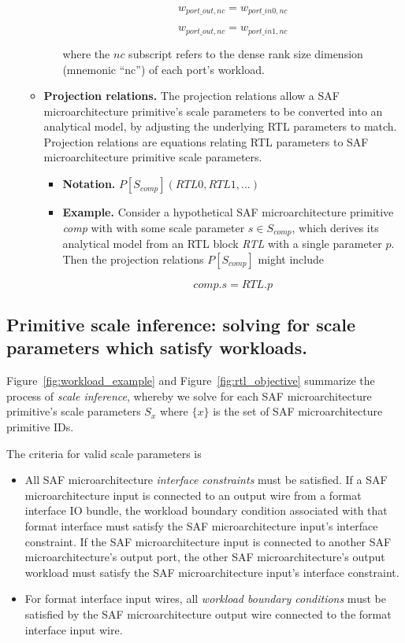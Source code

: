 \begin{itemize}
\begin{itemize}
\begin{itemize}
            \[w_{port\_out,nc} = w_{port\_in0,nc}\]

            \[w_{port\_out,nc} = w_{port\_in1,nc}\]

            where the $nc$ subscript refers to the dense rank size dimension (mnemonic ``nc'') of each port's workload.
        \end{itemize}
        \item \textbf{Projection relations.} The projection relations allow a SAF microarchitecture primitive's scale parameters to be converted into an analytical model, by adjusting the underlying RTL parameters to match. Projection relations are equations relating RTL parameters to SAF microarchitecture primitive scale parameters.
        \begin{itemize}
            \item \textbf{Notation.} $P[S_{comp}](RTL0,RTL1,...)$
            \item \textbf{Example.} Consider a hypothetical SAF microarchitecture primitive \textit{comp} with with some scale parameter $s \in S_{comp}$, which derives its analytical model from an RTL block \textit{RTL} with a single parameter $p$. Then the projection relations $P[S_{comp}]$ might include

            \[comp.s = RTL.p\]
        \end{itemize}
    \end{itemize}
\end{itemize}

\subsection{Primitive scale inference: solving for scale parameters which satisfy workloads.}

Figure~\ref{fig:workload_example} and Figure~\ref{fig:rtl_objective} summarize the process of \textit{scale inference}, whereby we solve for each SAF microarchitecture primitive's scale parameters $S_x$ where $\{x\}$ is the set of SAF microarchitecture primitive IDs. 

The criteria for valid scale parameters is

\begin{itemize}
    \item All SAF microarchitecture \textit{interface constraints} must be satisfied. If a SAF microarchitecture input is connected to an output wire from a format interface IO bundle, the workload boundary condition associated with that format interface must satisfy the SAF microarchitecture input's interface constraint. If the SAF microarchitecture input is connected to another SAF microarchitecture's output port, the other SAF microarchitecture's output workload must satisfy the SAF microarchitecture input's interface constraint.
    \item For format interface input wires, all \textit{workload boundary conditions} must be satisfied by the SAF microarchitecture output wire connected to the format interface input wire.
\end{itemize}

